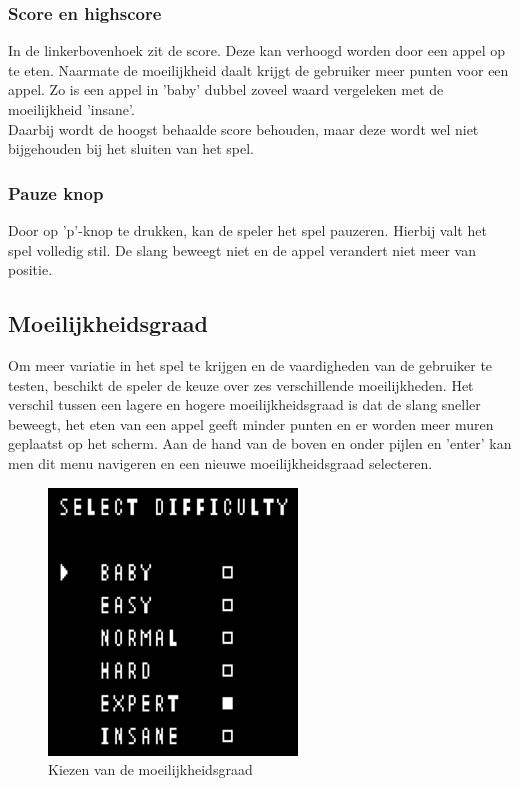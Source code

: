 \documentclass[11pt,a4paper]{article}
\begin{document}
\subsubsection{Score en highscore}
In de linkerbovenhoek zit de score. Deze kan verhoogd worden door een appel op te eten. Naarmate de moeilijkheid daalt krijgt de gebruiker meer punten voor een appel. Zo is een appel in 'baby' dubbel zoveel waard vergeleken met de moeilijkheid 'insane'. \\
Daarbij wordt de hoogst behaalde score behouden, maar deze wordt wel niet bijgehouden bij het sluiten van het spel.

\subsubsection{Pauze knop}
Door op 'p'-knop te drukken, kan de speler het spel pauzeren. Hierbij valt het spel volledig stil. De slang beweegt niet en de appel verandert niet meer van positie. 

\subsection{Moeilijkheidsgraad}
Om meer variatie in het spel te krijgen en de vaardigheden van de gebruiker te testen, beschikt de speler de keuze over zes verschillende moeilijkheden.
Het verschil tussen een lagere en hogere moeilijkheidsgraad is dat de slang sneller beweegt, het eten van een appel geeft minder punten en er worden meer muren geplaatst op het scherm.
Aan de hand van de boven en onder pijlen en 'enter' kan men dit menu navigeren en een nieuwe moeilijkheidsgraad selecteren.

\begin{figure}[h]
\centering
\includegraphics[scale=1]{diff.png}
\caption{Kiezen van de moeilijkheidsgraad}
\label{fig:diff}
\end{figure}
\end{document}
